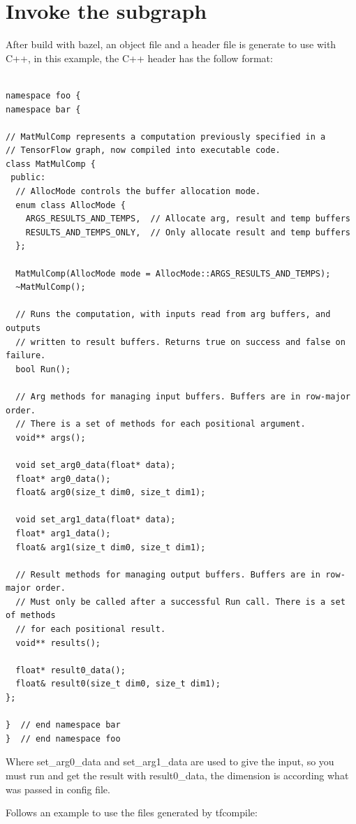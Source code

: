 \documentclass[11pt,openany]{book}
\begin{document}
\section{Invoke the subgraph}

After build with bazel, an object file and a header file is generate to use with C++, in this example, the C++ header has the follow format:

\begin{verbatim}

namespace foo {
namespace bar {

// MatMulComp represents a computation previously specified in a
// TensorFlow graph, now compiled into executable code.
class MatMulComp {
 public:
  // AllocMode controls the buffer allocation mode.
  enum class AllocMode {
    ARGS_RESULTS_AND_TEMPS,  // Allocate arg, result and temp buffers
    RESULTS_AND_TEMPS_ONLY,  // Only allocate result and temp buffers
  };

  MatMulComp(AllocMode mode = AllocMode::ARGS_RESULTS_AND_TEMPS);
  ~MatMulComp();

  // Runs the computation, with inputs read from arg buffers, and outputs
  // written to result buffers. Returns true on success and false on failure.
  bool Run();

  // Arg methods for managing input buffers. Buffers are in row-major order.
  // There is a set of methods for each positional argument.
  void** args();

  void set_arg0_data(float* data);
  float* arg0_data();
  float& arg0(size_t dim0, size_t dim1);

  void set_arg1_data(float* data);
  float* arg1_data();
  float& arg1(size_t dim0, size_t dim1);

  // Result methods for managing output buffers. Buffers are in row-major order.
  // Must only be called after a successful Run call. There is a set of methods
  // for each positional result.
  void** results();

  float* result0_data();
  float& result0(size_t dim0, size_t dim1);
};

}  // end namespace bar
}  // end namespace foo
\end{verbatim}

Where set\_arg0\_data and set\_arg1\_data are used to give the input, so you must run and get the result with result0\_data, the dimension is according what was passed in config file.

Follows an example to use the files generated by tfcompile:
\end{document}
